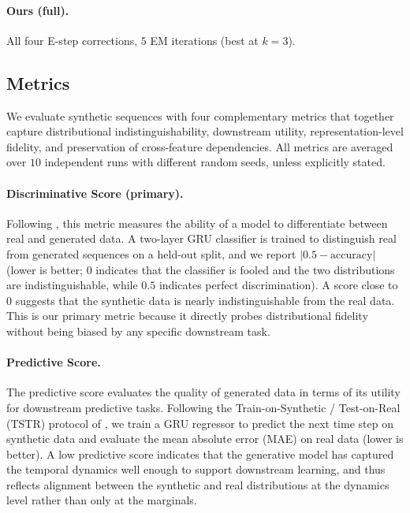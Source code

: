 \documentclass{article}
\theoremstyle{plain}
\theoremstyle{definition}
\theoremstyle{remark}
\begin{document}
\paragraph{Ours (full).}
All four E-step corrections, $5$ EM iterations (best at $k = 3$).

\subsection{Metrics}
\label{app:metrics}

We evaluate synthetic sequences with four complementary metrics that together capture distributional indistinguishability, downstream utility, representation-level fidelity, and preservation of cross-feature dependencies. All metrics are averaged over $10$ independent runs with different random seeds, unless explicitly stated.

\paragraph{Discriminative Score (primary).}
Following \citet{yoon2019timegan}, this metric measures the ability of a model to differentiate between real and generated data. A two-layer GRU classifier is trained to distinguish real from generated sequences on a held-out split, and we report $|0.5 - \mathrm{accuracy}|$ (lower is better; $0$ indicates that the classifier is fooled and the two distributions are indistinguishable, while $0.5$ indicates perfect discrimination). A score close to $0$ suggests that the synthetic data is nearly indistinguishable from the real data. This is our primary metric because it directly probes distributional fidelity without being biased by any specific downstream task.

\paragraph{Predictive Score.}
The predictive score evaluates the quality of generated data in terms of its utility for downstream predictive tasks. Following the Train-on-Synthetic / Test-on-Real (TSTR) protocol of \citet{yoon2019timegan}, we train a GRU regressor to predict the next time step on synthetic data and evaluate the mean absolute error (MAE) on real data (lower is better). A low predictive score indicates that the generative model has captured the temporal dynamics well enough to support downstream learning, and thus reflects alignment between the synthetic and real distributions at the dynamics level rather than only at the marginals.
\end{document}
